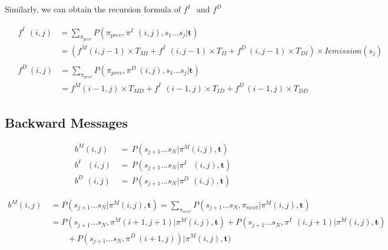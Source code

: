 \documentclass[10pt]{article}
\begin{document}
    Similarly, we can obtain the recursion formula of $f^{I\;\;}$ and $f^{D\;}$

    \begin{align}
      &\begin{aligned}
        f^{I\;\;}(i, j) &= \sum\nolimits_{\pi_{prev}} P(\pi_{prev}, \pi^{I\;\;}(i, j), s_1...s_j | \mathbf{t}) \\
                    &= (f^{M}(i, j-1) \times T_{MI}  + f^{I\;\;}(i, j-1) \times T_{II} + f^{D\;}(i, j-1) \times T_{DI}) \times Iemission(s_j)
      \end{aligned} \\
      &\begin{aligned}
        f^{D\;}(i, j) &= \sum\nolimits_{\pi_{prev}} P(\pi_{prev}, \pi^{D\;}(i, j), s_1...s_j | \mathbf{t}) \\
                    &= f^{M}(i-1, j) \times T_{MD}  + f^{I\;\;}(i-1, j) \times T_{ID} + f^{D\;}(i-1, j) \times T_{DD}
      \end{aligned}
    \end{align}

  \subsection{Backward Messages}
    \begin{equation}
    \begin{aligned}
      b^{M}(i, j) \,&=\, P(s_{j+1}...s_N | \pi^M(i, j), \mathbf{t}) \\
      b^{I\;\;}\,\,(i, j) \,&=\, P(s_{j+1}...s_N | \pi^{I\;\;}\,\,(i, j), \mathbf{t}) \\
      b^{D\;}\,(i, j) \,&=\, P(s_{j+1}...s_N | \pi^{D\;}\,(i, j), \mathbf{t})
    \end{aligned}
    \end{equation}

    \begin{equation} \label{eq121}
    \begin{aligned}
      b^M(i, j) \
        &= P(s_{j+1}...s_N | \pi^{M}(i, j), \mathbf{t}) = \sum\nolimits_{\pi_{next}} P(s_{j+1}...s_N, \pi_{next} | \pi^{M}(i, j), \mathbf{t}) \\
        &= P(s_{j+1}...s_N, \pi^M(i+1, j+1) | \pi^M(i, j), \mathbf{t}) + P(s_{j+1}...s_N, \pi^{I\;\;}(i, j+1) | \pi^M(i, j), \mathbf{t})  \\
        &\qquad + P(s_{j+1}...s_N, \pi^{D\;}(i+1, j)) | \pi^M(i, j), \mathbf{t})
    \end{aligned}
    \end{equation}
\end{document}
